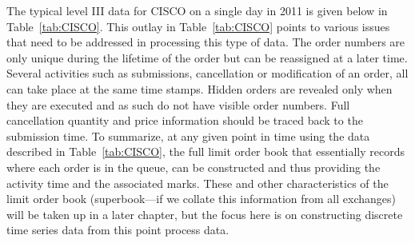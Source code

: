 The typical level III data for CISCO on a single day in 2011 is given below in Table~\ref{tab:CISCO}. This outlay in Table~\ref{tab:CISCO} points to various issues that need to be addressed in processing this type of data. The order numbers are only unique during the lifetime of the order but can be reassigned at a later time. Several activities such as submissions, cancellation or modification of an order, all can take place at the same time stamps. Hidden orders are revealed only when they are executed and as such do not have visible order numbers. Full cancellation quantity and price information should be traced back to the submission time. To summarize, at any given point in time using the data described in Table~\ref{tab:CISCO}, the full limit order book that essentially records where each order is in the queue, can be constructed and thus providing the activity time and the associated marks. These and other characteristics of the limit order book (superbook---if we collate this information from all exchanges) will be taken up in a later chapter, but the focus here is on constructing discrete time series data from this point process data. 
